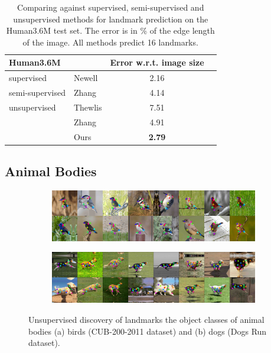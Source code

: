 			\begin{table}[htp]
				\caption{{Comparing against supervised, semi-supervised and unsupervised methods for landmark prediction on the Human3.6M test set. The
				error is in \% of the edge length of the image. All methods predict 16 landmarks.
				}}
				\label{tab:human}
				\centering
				\begin{tabular}{ll|cr}
				\hline
				 Human3.6M   & &  { Error w.r.t. image size}  \\
				 \hline
				 supervised & Newell \etal \cite{newell16hourglass}
				  &2.16  \\  \hline
				 semi-supervised & Zhang \etal \cite{zhang18}
				  & 4.14  \\ \hline
				 unsupervised & Thewlis \etal \cite{thewlis17}
				 & 7.51  \\
				  & Zhang \etal \cite{zhang18}
					& 4.91 \\
				  & Ours& \textbf{2.79} \\
				\hline
				\end{tabular}
			\end{table}




	\subsection{Animal Bodies}\label{sec:kp_animalbodies}
		\begin{figure}[htp]
			\centering
			\begin{subfigure}{1.\textwidth}
			\includegraphics[trim={0cm 0cm 0cm 0cm},clip, width=1.\linewidth]{fig/shape/0birds}\caption{}
			\end{subfigure}
			\begin{subfigure}{1.\textwidth}
			\includegraphics[trim={0cm 0cm 0cm 0cm},clip, width=1.\linewidth]{fig/shape/0dogs}\caption{}
			\end{subfigure}
			\caption{{Unsupervised discovery of landmarks the object classes of animal bodies (a) birds (CUB-200-2011 dataset) and (b) dogs (Dogs Run dataset).}}
			\label{fig:kp_animals}
		\end{figure}

